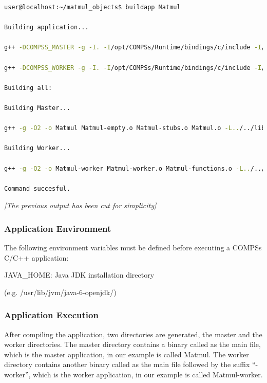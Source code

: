 \begin{lstlisting}[language=bash]
user@localhost:~/matmul_objects$ buildapp Matmul

Building application...

g++ -DCOMPSS_MASTER -g -I. -I/opt/COMPSs/Runtime/bindings/c/include -I/opt/COMPSs/Runtime/bindings/bindings-common/include -c Block.cc Matrix.cc ar rvs libmaster.a Block.o Matrix.o

g++ -DCOMPSS_WORKER -g -I. -I/opt/COMPSs/Runtime/bindings/c/include -I/opt/COMPSs/Runtime/bindings/bindings-common/include -c Block.cc Matrix.cc ar rvs libworker.a Block.o Matrix.o

Building all:

Building Master...

g++ -g -O2 -o Matmul Matmul-empty.o Matmul-stubs.o Matmul.o -L../../lib -lmaster -L/usr/lib/jvm/java-6-openjdk-amd64/jre/lib/amd64/server -ljvm -ldl -L/opt/COMPSs/Runtime/bindings/c/../bindings-common/lib -lbindings_common -L/opt/COMPSs/Runtime/bindings/c/lib -lcbindings -lboost_iostreams -lboost_serialization

Building Worker...

g++ -g -O2 -o Matmul-worker Matmul-worker.o Matmul-functions.o -L../../lib -lworker -ldl -lboost_iostreams -lboost_serialization -L/opt/COMPSs/Runtime/bindings/c/lib

Command succesful.
\end{lstlisting}

\emph{[The previous output has been cut for simplicity]}

\subsubsection{Application Environment}
The following environment variables must be defined before executing a COMPSs C/C++ application:
            
\begin{center}
JAVA\_HOME: Java JDK installation directory 

(e.g. /usr/lib/jvm/java-6-openjdk/)
\end{center}


\subsubsection{Application Execution}
After compiling the application, two directories are generated, the master and the worker directories. The master directory contains a binary called as the main file, which is the master application, in our example is called Matmul. The worker directory contains another binary called as the main file followed by the suffix ``-worker'', which is the worker application, in our example is called Matmul-worker.

